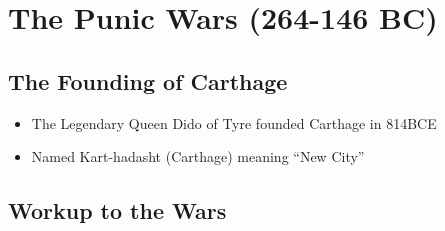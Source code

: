 \documentclass[12pt, twoside]{article}
\begin{document}
\section {The Punic Wars (264-146 BC)}
\subsection{The Founding of Carthage}
\begin{itemize}
\item The Legendary Queen Dido of Tyre founded Carthage in 814BCE
\item Named Kart-hadasht (Carthage) meaning “New City” 
\end{itemize}

\subsection{Workup to the Wars}
\end{document}
